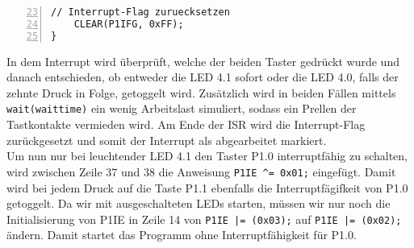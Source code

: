 \documentclass[11pt,a4paper,ngerman]{article}
\begin{document}
\begin{description}
\begin{lstlisting}[numbers=left,firstnumber=23]
	// Interrupt-Flag zuruecksetzen
	CLEAR(P1IFG, 0xFF);
}
\end{lstlisting}
\newpage
In dem Interrupt wird überprüft, welche der beiden Taster gedrückt wurde und danach entschieden, ob entweder die LED 4.1 sofort oder die LED 4.0, falls der zehnte Druck in Folge, getoggelt wird. Zusätzlich wird in beiden Fällen mittels \texttt{wait(waittime)} ein wenig Arbeitslast simuliert, sodass ein Prellen der Tastkontakte vermieden wird. Am Ende der ISR wird die Interrupt-Flag zurückgesetzt und somit der Interrupt als abgearbeitet markiert.
\\
Um nun nur bei leuchtender LED 4.1 den Taster P1.0 interruptfähig zu schalten, wird zwischen Zeile 37 und 38 die Anweisung \texttt{P1IE  \^{}= 0x01;} eingefügt. Damit wird bei jedem Druck auf die Taste P1.1 ebenfalls die Interruptfägifkeit von P1.0 getoggelt. Da wir mit ausgeschalteten LEDs starten, müssen wir nur noch die Initialisierung von P1IE in Zeile 14 von \texttt{P1IE |= (0x03);} auf \texttt{P1IE |= (0x02);} ändern. Damit startet das Programm ohne Interruptfähigkeit für P1.0.
\end{description}
\end{document}
